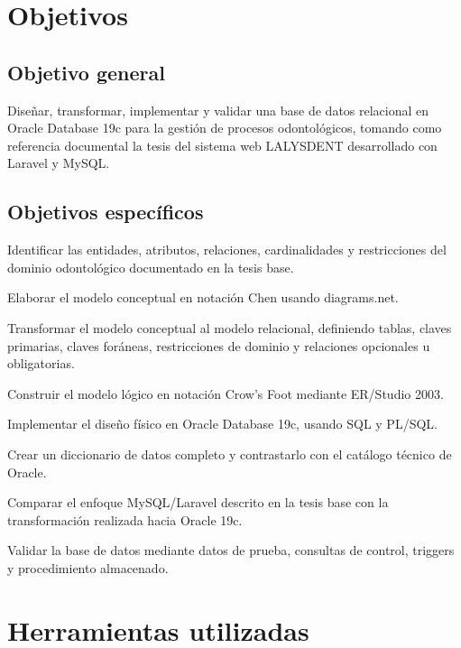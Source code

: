 \section{Objetivos}

\subsection{Objetivo general}

Diseñar, transformar, implementar y validar una base de datos relacional en Oracle Database 19c para la gestión de procesos odontológicos, tomando como referencia documental la tesis del sistema web LALYSDENT desarrollado con Laravel y MySQL.

\subsection{Objetivos específicos}

Identificar las entidades, atributos, relaciones, cardinalidades y restricciones del dominio odontológico documentado en la tesis base.

Elaborar el modelo conceptual en notación Chen usando diagrams.net.

Transformar el modelo conceptual al modelo relacional, definiendo tablas, claves primarias, claves foráneas, restricciones de dominio y relaciones opcionales u obligatorias.

Construir el modelo lógico en notación Crow's Foot mediante ER/Studio 2003.

Implementar el diseño físico en Oracle Database 19c, usando SQL y PL/SQL.

Crear un diccionario de datos completo y contrastarlo con el catálogo técnico de Oracle.

Comparar el enfoque MySQL/Laravel descrito en la tesis base con la transformación realizada hacia Oracle 19c.

Validar la base de datos mediante datos de prueba, consultas de control, triggers y procedimiento almacenado.

\section{Herramientas utilizadas}

